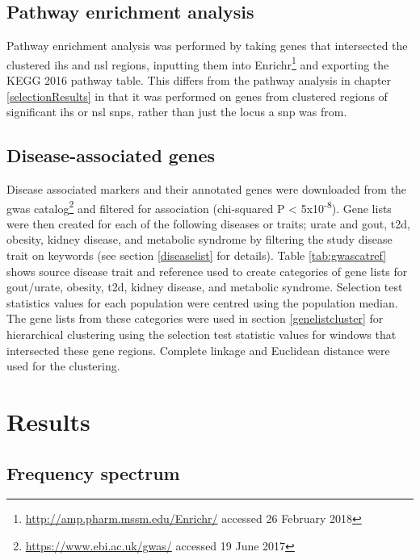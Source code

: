 \documentclass[]{report}
\begin{document}
\subsection{Pathway enrichment
analysis}\label{pathway-enrichment-analysis-1}

Pathway enrichment analysis was performed by taking genes that
intersected the clustered \gls{ihs} and \gls{nsl} regions, inputting
them into Enrichr\footnote{\url{http://amp.pharm.mssm.edu/Enrichr/}
  accessed 26 February 2018} \citep{Chen2013b, Kuleshov2016} and
exporting the KEGG 2016 pathway table. This differs from the pathway
analysis in chapter \ref{selectionResults} in that it was performed on
genes from clustered regions of significant \gls{ihs} or \gls{nsl}
\glspl{snp}, rather than just the locus a \gls{snp} was from.

\subsection{Disease-associated genes}\label{disease-associated-genes}

Disease associated markers and their annotated genes were downloaded
from the \gls{gwas} catalog\footnote{\url{https://www.ebi.ac.uk/gwas/}
  accessed 19 June 2017} \citep{MacArthur2017} and filtered for
association (chi-squared P \textless{} 5x10\textsuperscript{-8}). Gene
lists were then created for each of the following diseases or traits;
urate and gout, \gls{t2d}, obesity, kidney disease, and metabolic
syndrome by filtering the study disease trait on keywords (see section
\ref{diseaselist} for details). Table \ref{tab:gwascatref} shows source
disease trait and reference used to create categories of gene lists for
gout/urate, obesity, \gls{t2d}, kidney disease, and metabolic syndrome.
Selection test statistics values for each population were centred using
the population median. The gene lists from these categories were used in
section \ref{genelistcluster} for hierarchical clustering using the
selection test statistic values for windows that intersected these gene
regions. Complete linkage and Euclidean distance were used for the
clustering.




\section{Results}\label{results-1}

\subsection{Frequency spectrum}\label{frequency-spectrum-1}
\end{document}
